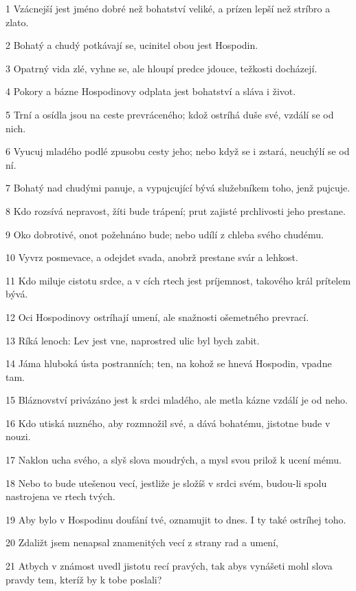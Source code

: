 \par 1 Vzácnejší jest jméno dobré než bohatství veliké, a prízen lepší než stríbro a zlato.
\par 2 Bohatý a chudý potkávají se, ucinitel obou jest Hospodin.
\par 3 Opatrný vida zlé, vyhne se, ale hloupí predce jdouce, težkosti docházejí.
\par 4 Pokory a bázne Hospodinovy odplata jest bohatství a sláva i život.
\par 5 Trní a osídla jsou na ceste prevráceného; kdož ostríhá duše své, vzdálí se od nich.
\par 6 Vyucuj mladého podlé zpusobu cesty jeho; nebo když se i zstará, neuchýlí se od ní.
\par 7 Bohatý nad chudými panuje, a vypujcující bývá služebníkem toho, jenž pujcuje.
\par 8 Kdo rozsívá nepravost, žíti bude trápení; prut zajisté prchlivosti jeho prestane.
\par 9 Oko dobrotivé, onot požehnáno bude; nebo udílí z chleba svého chudému.
\par 10 Vyvrz posmevace, a odejdet svada, anobrž prestane svár a lehkost.
\par 11 Kdo miluje cistotu srdce, a v cích rtech jest príjemnost, takového král prítelem bývá.
\par 12 Oci Hospodinovy ostríhají umení, ale snažnosti ošemetného prevrací.
\par 13 Ríká lenoch: Lev jest vne, naprostred ulic byl bych zabit.
\par 14 Jáma hluboká ústa postranních; ten, na kohož se hnevá Hospodin, vpadne tam.
\par 15 Bláznovství privázáno jest k srdci mladého, ale metla kázne vzdálí je od neho.
\par 16 Kdo utiská nuzného, aby rozmnožil své, a dává bohatému, jistotne bude v nouzi.
\par 17 Naklon ucha svého, a slyš slova moudrých, a mysl svou prilož k ucení mému.
\par 18 Nebo to bude utešenou vecí, jestliže je složíš v srdci svém, budou-li spolu nastrojena ve rtech tvých.
\par 19 Aby bylo v Hospodinu doufání tvé, oznamujit to dnes. I ty také ostríhej toho.
\par 20 Zdaližt jsem nenapsal znamenitých vecí z strany rad a umení,
\par 21 Atbych v známost uvedl jistotu recí pravých, tak abys vynášeti mohl slova pravdy tem, kteríž by k tobe poslali?
